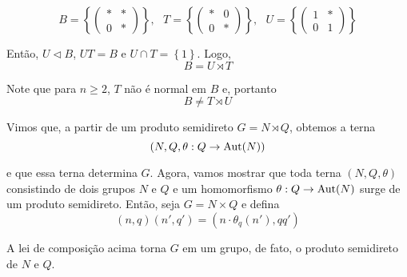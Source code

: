 	\begin{equation*}
	B = \left\{ \left(\begin{array}{cc}
	\ast & \ast \\
	0 & \ast 
	\end{array} \right) \right\}, \text{ } T = \left\{ \left(\begin{array}{cc}
	\ast & 0 \\
	0 & \ast 
	\end{array} \right) \right\}, \text{ }U = \left\{ \left(\begin{array}{cc}
	1 & \ast \\
	0 & 1 
	\end{array} \right) \right\}
	\end{equation*}
	\par\vspace{0.3cm} Então, $U\vartriangleleft B$, $UT=B$ e $U\cap T = \left\{1\right\}$. Logo,
	\begin{equation*}
	B = U\rtimes T
	\end{equation*}
	\par\vspace{0.3cm} Note que para $n\geq 2$, $T$ não é normal em $B$ e, portanto
	\begin{equation*}
	B\neq T\rtimes U
	\end{equation*}
	\par\vspace{0.3cm} Vimos que, a partir de um produto semidireto $G = N \rtimes Q$, obtemos a terna
	\begin{equation*}
	(N, Q, \theta:Q\to\operatorname{Aut}(N))
	\end{equation*}
	\par\vspace{0.3cm} e que essa terna determina $G$. Agora, vamos mostrar que toda terna $(N,Q,\theta)$ consistindo de dois grupos $N$ e $Q$ e um homomorfismo $\theta:Q\to\operatorname{Aut}(N)$ surge de um produto semidireto. Então, seja $G = N\times Q$ e defina
	\begin{equation*}
	(n,q)(n',q') = (n\cdot\theta_q(n'), qq')
	\end{equation*} 
	\begin{prop}
		\label{produto semidireto a partir de grupos}
		A lei de composição acima torna $G$ em um grupo, de fato, o produto semidireto de $N$ e $Q$.
	\end{prop}
